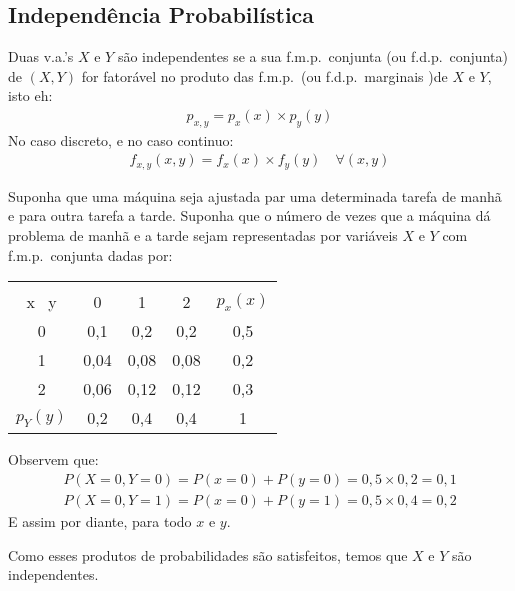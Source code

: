 \subsection{Independência Probabilística}
\begin{description}
  \item  Duas v.a.'s $X$ e $Y$ são independentes se a sua f.m.p.\ conjunta (ou f.d.p.\ conjunta) de $(X,Y)$ for fatorável no produto das f.m.p.\ (ou f.d.p.\ marginais )de $X$ e $Y$, isto eh:
  \begin{align}
    p_{x,y}  = p_{x}(x) \times p_{y}(y)
  \end{align}
  No caso discreto, e no caso continuo:
  \begin{align}
    f_{x,y} (x,y)= f_{x}(x) \times f_{y}(y) \quad \forall (x,y)
  \end{align}
  \begin{example} 
    Suponha que uma máquina seja ajustada par uma determinada tarefa de manhã e para outra tarefa a tarde. Suponha que o número de vezes que a máquina dá problema de manhã e a tarde sejam representadas por variáveis  $X$ e $Y$ com f.m.p.\ conjunta dadas por:

      \begin{tabular}{c c c c c}
        \toprule\\
        x \ y & 0 & 1 & 2 &$p_{x}(x)$ \\ \midrule
        0 & 0{,}1 & 0{,}2 & 0{,}2& 0{,}5\\ \midrule
        1 & 0{,}04 & 0{,}08& 0{,}08&0{,}2 \\ \midrule
        2 & 0{,}06 & 0{,}12 & 0{,}12 & 0{,}3 \\ \midrule 
        $p_{Y}(y)$& 0{,}2 & 0{,}4 &0{,}4 & 1\\ \bottomrule
      \end{tabular}
    Observem que:
    \begin{align*}
      P(X=0, Y=0) = P(x=0) + P(y=0)= 0,5 \times 0,2 = 0,1
    \end{align*}
    \begin{align*}
      P(X=0, Y=1) = P(x=0) + P(y=1)= 0,5 \times 0,4 = 0,2
    \end{align*}
    E assim por diante,  para todo $x$ e $y$.

    Como esses produtos de probabilidades são satisfeitos, temos que $X$ e $Y$ são independentes.
\end{example}
\end{description}
